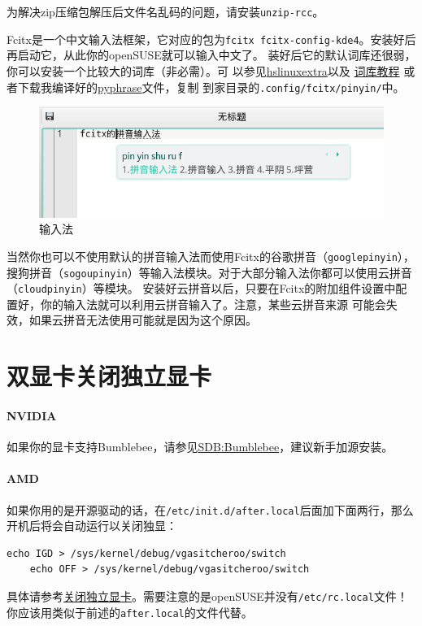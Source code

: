 \documentclass[11pt,openany]{book}
\newcommand{\command}[1]{\texttt{\textcolor{codec}{#1}}}
\newcommand{\soft}[1]{\texttt{\textcolor{dgreen}{#1}}}
\begin{document}
为解决zip压缩包解压后文件名乱码的问题，请安装\soft{unzip-rcc}。

Fcitx是一个中文输入法框架，它对应的包为\soft{fcitx fcitx-config-kde4}。安装好后再启动它，从此你的openSUSE就可以输入中文了。
装好后它的默认词库还很弱，你可以安装一个比较大的词库（非必需）。可%
以参见\href{https://code.google.com/p/hslinuxextra/}{hs\-linux\-extra}以及%
\href{https://www.librehat.com/fcitx-sogou-pinyin-cell-database-convert-import-guide/}{词库教程}%
或者下载我编译好的\href{http://pan.baidu.com/s/1i3HtJ4T}{pyphrase}文件，复制
到家目录的\command{.config/fcitx/pinyin/}中。
\begin{figure}[htbp]
\centering
\includegraphics[width=\textwidth]{./pic/fcitx.png} 
\caption{输入法}\label{fcitx}
\end{figure}
当然你也可以不使用默认的拼音输入法而使用Fcitx的谷歌拼音（\soft{goo\-gle\-pin\-yin}），
搜狗拼音（\soft{so\-gou\-pin\-yin}）等输入法模块。对于大部分输入法你都可以使用云拼音（\soft{cloud\-pin\-yin}）等模块。
安装好云拼音以后，只要在Fcitx的附加组件设置中配置好，你的输入法就可以利用云拼音输入了。注意，某些云拼音来源
可能会失效，如果云拼音无法使用可能就是因为这个原因。
\section[双显卡]{双显卡关闭独立显卡}
\paragraph{NVIDIA} 如果你的显卡支持Bumblebee，请参见\href{https://zh.opensuse.org/SDB:Bumblebee}{SDB:Bumblebee}，建议新手加源安装。

\paragraph{AMD} 如果你用的是开源驱动的话，在\command{/etc/init.d/after.local}后面加下面两行，那么开机后将会自动运行以关闭独显：
\begin{Verbatim}[formatcom=\color{codec}]
    echo IGD > /sys/kernel/debug/vgasitcheroo/switch
    echo OFF > /sys/kernel/debug/vgasitcheroo/switch    
\end{Verbatim}
具体请参考\href{https://linuxtoy.org/archives/how-to-use-vga-switcheroo-disable-video-card-linux-kms.html}{关闭独立显卡}。需要注意的是openSUSE并没有\command{/etc/rc.local}文件！你应该用类似于前述的\command{after.local}的文件代替。
\end{document}

